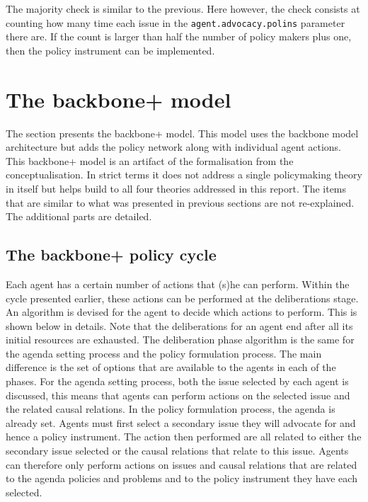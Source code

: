 The majority check is similar to the previous. Here however, the check consists at counting how many time each issue in the \texttt{agent.advocacy.polins} parameter there are. If the count is larger than half the number of policy makers plus one, then the policy instrument can be implemented.


\section{The backbone+ model}

The section presents the backbone+ model. This model uses the backbone model architecture but adds the policy network along with individual agent actions. This backbone+ model is an artifact of the formalisation from the conceptualisation. In strict terms it does not address a single policymaking theory in itself but helps build to all four theories addressed in this report. The items that are similar to what was presented in previous sections are not re-explained. The additional parts are detailed.

\subsection{The backbone+ policy cycle}

Each agent has a certain number of actions that (s)he can perform. Within the cycle presented earlier, these actions can be performed at the deliberations stage. An algorithm is devised for the agent to decide which actions to perform.  This is shown below in details. Note that the deliberations for an agent end after all its initial resources are exhausted. The deliberation phase algorithm is the same for the agenda setting process and the policy formulation process. The main difference is the set of options that are available to the agents in each of the phases. For the agenda setting process, both the issue selected by each agent is discussed, this means that agents can perform actions on the selected issue and the related causal relations. In the policy formulation process, the agenda is already set. Agents must first select a secondary issue they will advocate for and hence a policy instrument. The action then performed are all related to either the secondary issue selected or the causal relations that relate to this issue. Agents can therefore only perform actions on issues and causal relations that are related to the agenda policies and problems and to the policy instrument they have each selected.


